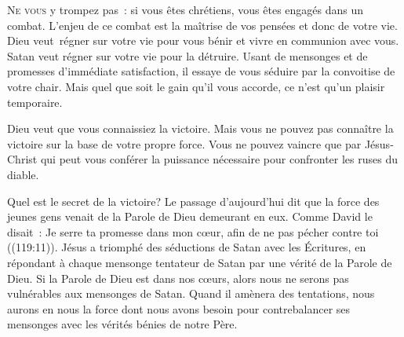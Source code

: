 




\lettrine{N}{e vous} y trompez pas~: si vous êtes chrétiens,
 vous êtes engagés dans un combat. L'enjeu de ce combat est la maîtrise
 de vos pensées et donc de votre vie.
 Dieu veut~régner sur votre vie
 pour vous bénir et vivre en communion avec vous.
 Satan veut régner sur votre vie pour la détruire.
 Usant de mensonges et de promesses d'immédiate satisfaction,
 il essaye de vous séduire par la convoitise de votre chair.
 Mais quel que soit le gain qu'il vous accorde,
 ce n'est qu'un plaisir temporaire.


Dieu veut que vous connaissiez la victoire. Mais vous ne pouvez pas connaître
 la victoire sur la base de votre propre force. Vous ne pouvez vaincre
 que par Jésus-Christ qui peut vous conférer la puissance nécessaire pour
 confronter les ruses du diable.

Quel est le secret de la victoire? Le passage d'aujourd'hui dit que la force
 des jeunes gens venait de la Parole de Dieu demeurant en eux.
 Comme David le disait~: 
 \og Je serre ta promesse dans mon c\oe{}ur, afin de ne pas pécher contre toi \fg{}
 ((119:11)).
 Jésus a triomphé des séductions de Satan avec les Écritures, en répondant
 à chaque mensonge tentateur de Satan par une vérité de la Parole de Dieu.
 Si la Parole de Dieu est dans nos c\oe{}urs, alors nous ne serons pas
 vulnérables aux mensonges de Satan.
 Quand il amènera des tentations, nous aurons en nous la force dont nous
 avons besoin pour contrebalancer ses mensonges avec les vérités bénies 
 de notre Père.


\dvrule






